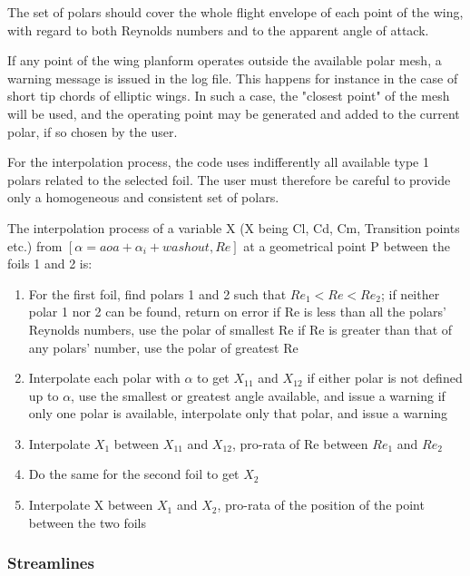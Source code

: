 \documentclass[a4paper,twoside,12pt,dvips]{article}
\begin{document}
The set of polars should cover the whole flight envelope of each point
of the wing, with regard to both Reynolds numbers and to the apparent
angle of attack.

If any point of the wing planform operates outside the available polar
mesh, a warning message is issued in the log file. This happens for
instance in the case of short tip chords of elliptic wings. In such a
case, the "closest point" of the mesh will be used, and the
operating point may be generated and added to the current polar, if so
chosen by the user.

For the interpolation process, the code uses indifferently all
available type 1 polars related to the selected foil. The user must
therefore be careful to provide only a homogeneous and consistent set
of polars.

The interpolation process of a variable X (X being Cl, Cd, Cm,
Transition points etc.) from $[\alpha = aoa + \alpha_i + washout, Re]$
at a geometrical point P between the foils 1 and 2 is:

\begin{enumerate}
\item For the first foil, find polars 1 and 2 such that
$Re_1 <  Re < Re_2$;\newline
if neither polar 1 nor 2 can be found, return on error\newline
if Re is less than all the polars' Reynolds numbers, use the polar of
smallest Re\newline
if Re is greater than that of any polars' number, use the polar of
greatest Re
\item Interpolate each polar with $\alpha$ to get $X_{11}$ and
$X_{12}$\newline
if either polar is not defined up to $\alpha$, use the smallest or
greatest angle available, and issue a warning\newline
if only one polar is available, interpolate only that polar, and issue
a warning
\item Interpolate $X_1$ between $X_{11}$ and $X_{12}$, pro-rata of Re
between $Re_1$ and $Re_2$
\item Do the same for the second foil to get $X_2$
\item Interpolate X between $X_1$ and $X_2$, pro-rata of the position
of the point between the two foils
\end{enumerate}


\subsubsection{Streamlines}
\end{document}
